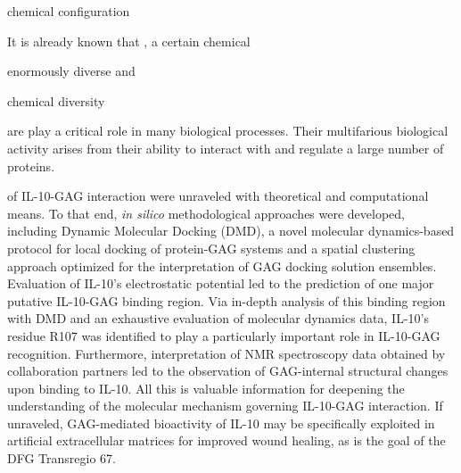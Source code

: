  chemical
configuration


It is already known that , a certain chemical




enormously diverse and

chemical diversity







are play a critical role in many biological processes.
Their multifarious biological activity arises from their ability to interact
with and regulate a large number of proteins.

 of IL-10-GAG interaction were unraveled with
theoretical and computational means. To that end, \textit{in silico}
methodological approaches were developed, including Dynamic Molecular Docking
(DMD), a novel molecular dynamics-based protocol for local docking of
protein-GAG systems and a spatial clustering approach optimized for the
interpretation of GAG docking solution ensembles. Evaluation of IL-10's
electrostatic potential led to the prediction of one major putative IL-10-GAG
binding region. Via in-depth analysis of this binding region with DMD and an
exhaustive evaluation of molecular dynamics data, IL-10's residue R107 was
identified to play a particularly important role in IL-10-GAG recognition.
Furthermore, interpretation of NMR spectroscopy data obtained by collaboration
partners led to the observation of GAG-internal structural changes upon binding
to IL-10. All this is valuable information for deepening the understanding of
the molecular mechanism governing IL-10-GAG interaction. If unraveled,
GAG-mediated bioactivity of IL-10 may be specifically exploited in artificial
extracellular matrices for improved wound healing, as is the goal of the DFG
Transregio 67.

\lipsum[1-4]